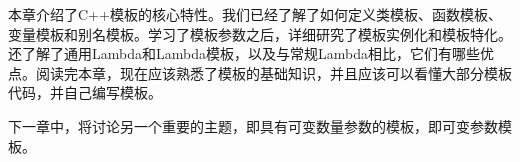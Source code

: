 本章介绍了C++模板的核心特性。我们已经了解了如何定义类模板、函数模板、变量模板和别名模板。学习了模板参数之后，详细研究了模板实例化和模板特化。还了解了通用Lambda和Lambda模板，以及与常规Lambda相比，它们有哪些优点。阅读完本章，现在应该熟悉了模板的基础知识，并且应该可以看懂大部分模板代码，并自己编写模板。

下一章中，将讨论另一个重要的主题，即具有可变数量参数的模板，即可变参数模板。